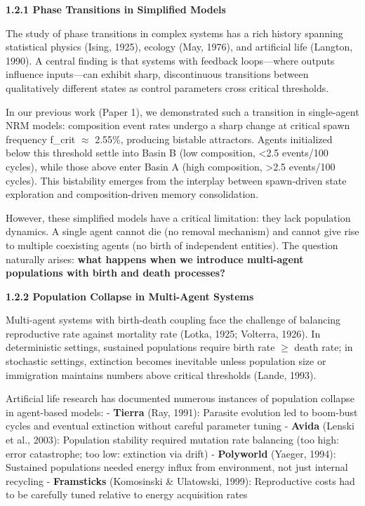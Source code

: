 \documentclass[
]{article}
\begin{document}
\textbf{1.2.1 Phase Transitions in Simplified Models}

The study of phase transitions in complex systems has a rich history
spanning statistical physics (Ising, 1925), ecology (May, 1976), and
artificial life (Langton, 1990). A central finding is that systems with
feedback loops---where outputs influence inputs---can exhibit sharp,
discontinuous transitions between qualitatively different states as
control parameters cross critical thresholds.

In our previous work (Paper 1), we demonstrated such a transition in
single-agent NRM models: composition event rates undergo a sharp change
at critical spawn frequency f\_crit $\approx$ 2.55\%, producing bistable
attractors. Agents initialized below this threshold settle into Basin B
(low composition, \textless2.5 events/100 cycles), while those above
enter Basin A (high composition, \textgreater2.5 events/100 cycles).
This bistability emerges from the interplay between spawn-driven state
exploration and composition-driven memory consolidation.

However, these simplified models have a critical limitation: they lack
population dynamics. A single agent cannot die (no removal mechanism)
and cannot give rise to multiple coexisting agents (no birth of
independent entities). The question naturally arises: \textbf{what
happens when we introduce multi-agent populations with birth and death
processes?}

\textbf{1.2.2 Population Collapse in Multi-Agent Systems}

Multi-agent systems with birth-death coupling face the challenge of
balancing reproductive rate against mortality rate (Lotka, 1925;
Volterra, 1926). In deterministic settings, sustained populations
require birth rate $\geq$ death rate; in stochastic settings, extinction
becomes inevitable unless population size or immigration maintains
numbers above critical thresholds (Lande, 1993).

Artificial life research has documented numerous instances of population
collapse in agent-based models: - \textbf{Tierra} (Ray, 1991): Parasite
evolution led to boom-bust cycles and eventual extinction without
careful parameter tuning - \textbf{Avida} (Lenski et al., 2003):
Population stability required mutation rate balancing (too high: error
catastrophe; too low: extinction via drift) - \textbf{Polyworld}
(Yaeger, 1994): Sustained populations needed energy influx from
environment, not just internal recycling - \textbf{Framsticks}
(Komosinski \& Ulatowski, 1999): Reproductive costs had to be carefully
tuned relative to energy acquisition rates
\end{document}
